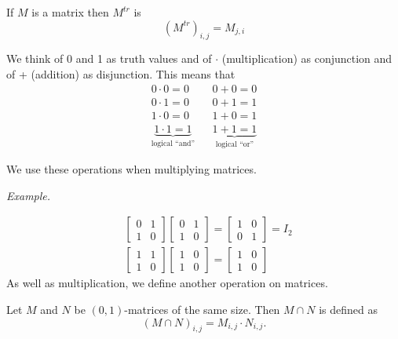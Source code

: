 \documentclass[11pt]{article}
\begin{document}
    If $M$ is a matrix then \(M^{tr}\) is \[(M^{tr})_{i,j} = M_{j,i}\]

    We think of 0 and 1 as truth values and of \(\cdot\) (multiplication) as conjunction and of + (addition) as disjunction. This means that
    \begin{align*}
        0 \cdot 0 = 0 && 0 + 0 = 0 \\
        0 \cdot 1 = 0 && 0 + 1 = 1 \\
        1 \cdot 0 = 0 && 1 + 0 = 1 \\
        \underbrace{1 \cdot 1 = 1}_\text{logical ``and''} && \underbrace{1 + 1 = 1}_\text{logical ``or''}
    \end{align*}

    We use these operations when multiplying matrices.

    \vspace{1em}

    \emph{Example.}

    \begin{align*}
        &\begin{bmatrix}
            0 & 1 \\ 1 & 0
        \end{bmatrix} \begin{bmatrix}
                        0 & 1 \\ 1 & 0
                      \end{bmatrix} = \begin{bmatrix}
                                        1 & 0 \\ 0 & 1
                                    \end{bmatrix} = I_2 \\
        &\begin{bmatrix}
            1 & 1 \\ 1 & 0
        \end{bmatrix} \begin{bmatrix}
                        1 & 0 \\ 1 & 0
                    \end{bmatrix} = \begin{bmatrix}
                                    1 & 0 \\ 1 & 0
                                \end{bmatrix}
    \end{align*}
    As well as multiplication, we define another operation on matrices.

    Let $M$ and $N$ be \((0,1)\)-matrices of the same size. Then \(M \cap N\) is defined as \[(M \cap N)_{i,j} = M_{i,j} \cdot N_{i,j}.\]
\end{document}
